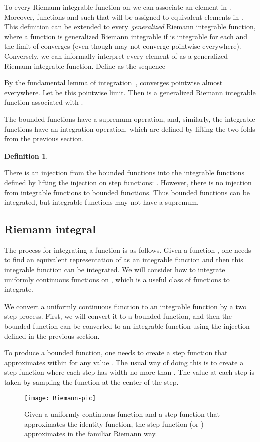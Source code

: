 \documentclass{elsarticle}
\newcommand{\tmem}[1]{{\em #1\/}}
\newtheorem{definition}{Definition}
\newcommand{\uc}{uniformly continuous}
\begin{document}
To every Riemann integrable function on  we can associate
an element in . Moreover, functions  and  such that
 will be assigned to equivalent elements in . This definition can be extended to every {\tmem{generalized}}
Riemann integrable function, where a function  is generalized Riemann
integrable if  is integrable for each  and the limit
of converges (even though  may not converge pointwise
everywhere). Conversely, we can informally interpret every element  of  as a generalized Riemann integrable function. Define  as the
sequence

By the fundamental lemma of integration~{\cite{lang:1993}},  converges
pointwise almost everywhere. Let  be this pointwise limit. Then  is a
generalized Riemann integrable function associated with .

The bounded functions have a supremum operation,
 and, similarly, the integrable
functions have an integration operation,  which are defined by lifting the two folds from the previous section.

\begin{definition}\label{IntegralQ}
  
\end{definition}

There is an injection from the bounded functions into the integrable functions
defined by lifting the injection on step functions: . However, there is no injection from
integrable functions to bounded functions. Thus bounded functions can be
integrated, but integrable functions may not have a supremum.

\subsection{Riemann integral}\label{ss:riemann}The process for integrating a
function is as follows. Given a function , one needs to find an equivalent
representation of  as an integrable function and then this integrable
function can be integrated. We will consider how to integrate {\uc} functions
on , which is a useful class of functions to integrate.

We convert a {\uc} function to an integrable function by a two step process.
First, we will convert it to a bounded function, and then the bounded function
can be converted to an integrable function using the injection defined in the
previous section.

To produce a bounded function, one needs to create a step function that
approximates  within  for any value . The usual way of doing this is to create a step function where
each step has width no more than . The
value at each step is taken by sampling the function at the center of the
step.
\begin{figure}[h]\label{fig:Riemann}
  \hspace*{-2.5cm}\texttt{[image: Riemann-pic]}\vspace*{-17mm}
  \caption{Given a uniformly continuous function  and a step function 
  that approximates the identity function, the step function  (or ) approximates  in the
  familiar Riemann way.}
\end{figure}
\end{document}
